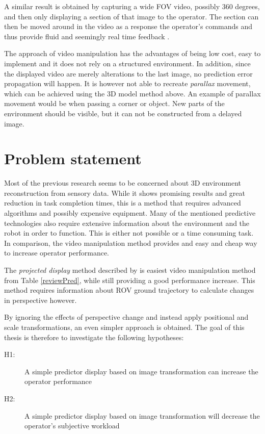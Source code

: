 A similar result is obtained by capturing a wide FOV video, possibly 360 degrees, and then only displaying a section of that image to the operator. The section can then be moved around in the video as a response the operator's commands and thus provide fluid and seemingly real time feedback \citep{Baldwin1999}.

The approach of video manipulation has the advantages of being low cost, easy to implement and it does not rely on a structured environment. In addition, since the displayed video are merely alterations to the last image, no prediction error propagation will happen. It is however not able to recreate \textit{parallax} movement, which can be achieved using the 3D model method above. An example of parallax movement would be when passing a corner or object. New parts of the environment should be visible, but it can not be constructed from a delayed image.

\clearpage
\section{Problem statement}

Most of the previous research seems to be concerned about 3D environment reconstruction from sensory data. While it shows promising results and great reduction in task completion times, this is a method that requires advanced algorithms and possibly expensive equipment. Many of the mentioned predictive technologies also require extensive information about the environment and the robot in order to function. This is either not possible or a time consuming task. In comparison, the video manipulation method provides and easy and cheap way to increase operator performance.

The \textit{projected display} method described by \citet{Matheson2013} is easiest video manipulation method from Table \ref{reviewPred}, while still providing a good performance increase. This method requires information about ROV ground trajectory to calculate changes in perspective however. 

By ignoring the effects of perspective change and instead apply positional and scale transformations, an even simpler approach is obtained. The goal of this thesis is therefore to investigate the following hypotheses:

\begin{description}
\item[H1:] A simple predictor display based on image transformation can increase the operator performance
 
 \item[H2:] A simple predictor display based on image transformation will decrease the operator's subjective workload
\end{description}
